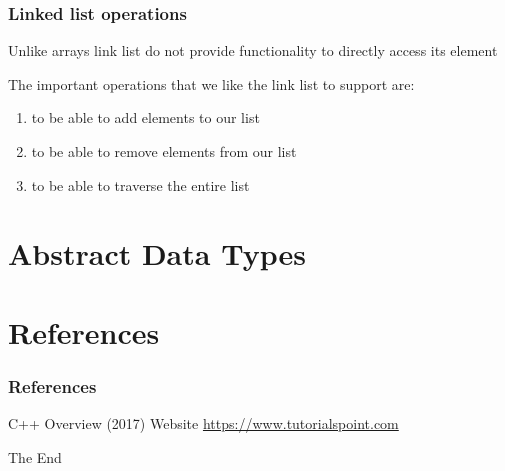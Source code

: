 \documentclass{beamer}
\begin{document}
\begin{frame}[fragile]
\frametitle{Linked list operations}
Unlike arrays link list do not provide functionality to directly
access its element

\medskip

The important operations that we like the link list to support are:
\begin{enumerate}
\item to be able to add elements to our list
\item to be able to remove elements from our list
\item to be able to traverse the entire list
\end{enumerate} 

\end{frame}

\section{Abstract Data Types}
\section{References}
\begin{frame}
\frametitle{References}
\footnotesize{
\begin{thebibliography}{99} %
 C++ Overview (2017)
\newblock Website
\newblock \url{https://www.tutorialspoint.com}
\end{thebibliography}
}
\end{frame}


\begin{frame}
\Huge{\centerline{The End}}
\end{frame}

\end{document}
